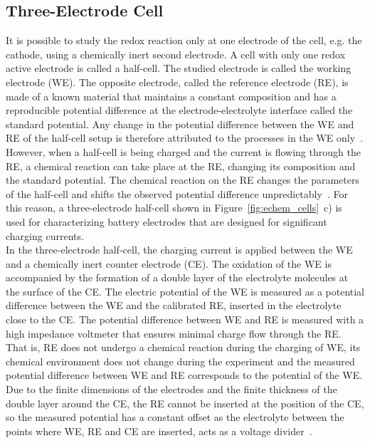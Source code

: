 \subsection{Three-Electrode Cell}
It is possible to study the redox reaction only at one electrode of the cell, e.g. the cathode, using a chemically inert second electrode. A cell with only one redox active electrode is called a half-cell. The studied electrode is called the working electrode (WE). The opposite electrode, called the reference electrode (RE), is made of a known material that maintains a constant composition and has a reproducible potential difference at the electrode-electrolyte interface called the standard potential. Any change in the potential difference between the WE and RE of the half-cell setup is therefore attributed to the processes in the WE only~\cite{Bard_book,Reddy_book}.\\
However, when a half-cell is being charged and the current is flowing through the RE, a chemical reaction can take place at the RE, changing its composition and the standard potential. The chemical reaction on the RE changes the parameters of the half-cell and shifts the observed potential difference unpredictably~\cite{Bard_book,DOM}. For this reason, a three-electrode half-cell shown in Figure~\ref{fig:echem_cells}~c) is used for characterizing battery electrodes that are designed for significant charging currents.\\

In the three-electrode half-cell, the charging current is applied between the WE and a chemically inert counter electrode (CE). The oxidation of the WE is accompanied by the formation of a double layer of the electrolyte molecules at the surface of the CE. The electric potential of the WE is measured as a potential difference between the WE and the calibrated RE, inserted in the electrolyte close to the CE. The potential difference between WE and RE is measured with a high impedance voltmeter that ensures minimal charge flow through the RE. That is, RE does not undergo a chemical reaction during the charging of WE, its chemical environment does not change during the experiment and the measured potential difference between WE and RE corresponds to the potential of the WE. Due to the finite dimensions of the electrodes and the finite thickness of the double layer around the CE, the RE cannot be inserted at the position of the CE, so the measured potential has a constant offset as the electrolyte between the points where WE, RE and CE are inserted, acts as a voltage divider~\cite{Bard_book}.\\

